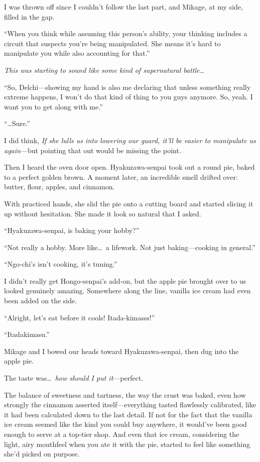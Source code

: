 \documentclass[
    a4paper,
    12pt,
    twoside,
    openany,
    UTF8,
    fontset=windows
]{ctexbook}
\begin{document}
I was thrown off since I couldn't follow the last part, and Mikage, at my side, filled in the gap.

``When you think while assuming this person's ability, your thinking includes a circuit that suspects you're being manipulated. She means it's hard to manipulate you while also accounting for that.''

\textit{This was starting to sound like some kind of supernatural battle\dots}

``So, Delchi---showing my hand is also me declaring that unless something really extreme happens, I won't do that kind of thing to you guys anymore. So, yeah. I want you to get along with me.''

``\dots Sure.''

I did think, \textit{If she lulls us into lowering our guard, it'll be easier to manipulate us again}---but pointing that out would be missing the point.

Then I heard the oven door open. Hyakuzawa-senpai took out a round pie, baked to a perfect golden brown. A moment later, an incredible smell drifted over: butter, flour, apples, and cinnamon.

With practiced hands, she slid the pie onto a cutting board and started slicing it up without hesitation. She made it look so natural that I asked.

``Hyakuzawa-senpai, is baking your hobby?''

``Not really a hobby. More like\dots\ a lifework. Not just baking---cooking in general.''

``Ngo-chi's isn't cooking, it's tuning.''

I didn't really get Hongo-senpai's add-on, but the apple pie brought over to us looked genuinely amazing. Somewhere along the line, vanilla ice cream had even been added on the side.

``Alright, let's eat before it cools! Itada-kimasss!''

``Itadakimasu.''

Mikage and I bowed our heads toward Hyakuzawa-senpai, then dug into the apple pie.

The taste was\dots\
\textit{how should I put it}---perfect.

The balance of sweetness and tartness, the way the crust was baked, even how strongly the cinnamon asserted itself---everything tasted flawlessly calibrated, like it had been calculated down to the last detail. If not for the fact that the vanilla ice cream seemed like the kind you could buy anywhere, it would've been good enough to serve at a top-tier shop. And even that ice cream, considering the light, airy mouthfeel when you ate it with the pie, started to feel like something she'd picked on purpose.
\end{document}
